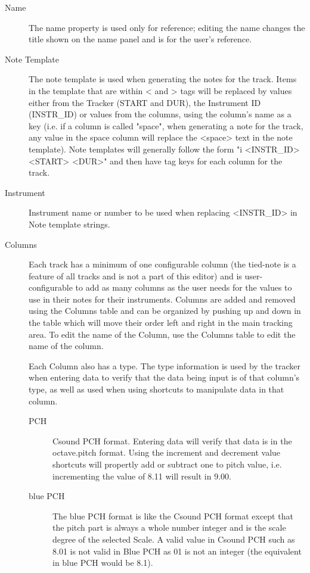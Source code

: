\begin{description}
\item[Name]
The name property is used only for reference; editing the name changes
the title shown on the name panel and is for the user's reference.
\item[Note Template]
The note template is used when generating the notes for the track. Items
in the template that are within \textless{} and \textgreater{} tags will
be replaced by values either from the Tracker (START and DUR), the
Instrument ID (INSTR\_ID) or values from the columns, using the column's
name as a key (i.e. if a column is called "space", when generating a
note for the track, any value in the space column will replace the
\textless{}space\textgreater{} text in the note template). Note
templates will generally follow the form "i
\textless{}INSTR\_ID\textgreater{} \textless{}START\textgreater{}
\textless{}DUR\textgreater{}" and then have tag keys for each column for
the track.
\item[Instrument]
Instrument name or number to be used when replacing
\textless{}INSTR\_ID\textgreater{} in Note template strings.
\item[Columns]
Each track has a minimum of one configurable column (the tied-note is a
feature of all tracks and is not a part of this editor) and is
user-configurable to add as many columns as the user needs for the
values to use in their notes for their instruments. Columns are added
and removed using the Columns table and can be organized by pushing up
and down in the table which will move their order left and right in the
main tracking area. To edit the name of the Column, use the Columns
table to edit the name of the column.

Each Column also has a type. The type information is used by the tracker
when entering data to verify that the data being input is of that
column's type, as well as used when using shortcuts to manipulate data
in that column.

\begin{description}
\item[PCH]
Csound PCH format. Entering data will verify that data is in the
octave.pitch format. Using the increment and decrement value shortcuts
will propertly add or subtract one to pitch value, i.e. incrementing the
value of 8.11 will result in 9.00.
\item[blue PCH]
The blue PCH format is like the Csound PCH format except that the pitch
part is always a whole number integer and is the scale degree of the
selected Scale. A valid value in Csound PCH such as 8.01 is not valid in
Blue PCH as 01 is not an integer (the equivalent in blue PCH would be
8.1).


\end{description}
\end{description}
